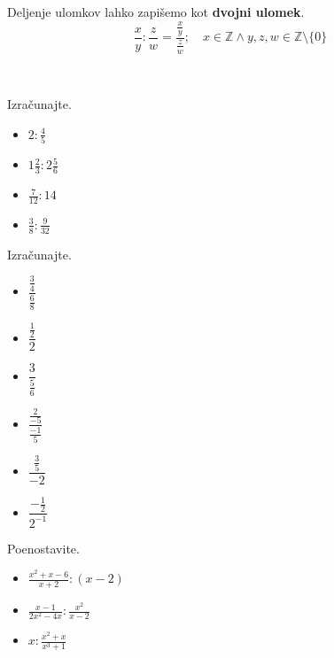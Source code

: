             
                Deljenje ulomkov lahko zapišemo kot \textbf{dvojni ulomek}.
                $$\dfrac{x}{y}:\dfrac{z}{w}=\dfrac{\frac{x}{y}}{\frac{z}{w}}; \quad x\in\mathbb{Z}\land y,z,w\in\mathbb{Z}\setminus\{0\} $$
            

                ~
        



        
            \begin{naloga}
                Izračunajte.
                \begin{itemize}
                    \item $2:\frac{4}{5}$ 
                    \item $1\frac{2}{3}:2\frac{5}{6}$ 
                    \item $\frac{7}{12}:14$ 
                    \item $\frac{3}{8}:\frac{9}{32}$ 
                \end{itemize}
            \end{naloga}
        


        
            \begin{naloga}
                Izračunajte.
                \begin{itemize}
                            \item $\dfrac{\frac{3}{4}}{\frac{6}{8}}$ 
                            \item $\dfrac{\frac{1}{2}}{2}$ 
                            \item $\dfrac{3}{\frac{5}{6}}$ 
                            \item $\dfrac{\frac{2}{-5}}{\frac{-1}{5}}$ 
                            \item $\dfrac{\frac{3}{5}}{-2}$ 
                            \item $\dfrac{-\frac{1}{2}}{2^{-1}}$ 

                \end{itemize}
            \end{naloga}
        


        
            \begin{naloga}
                Poenostavite.
                \begin{itemize}
                    \item $\frac{x^2+x-6}{x+2}:(x-2)$ 
                    \item $\frac{x-1}{2x^2-4x}:\frac{x^2}{x-2}$ 
                    \item $x:\frac{x^2+x}{x^3+1}$ 
                \end{itemize}
            \end{naloga}
        

